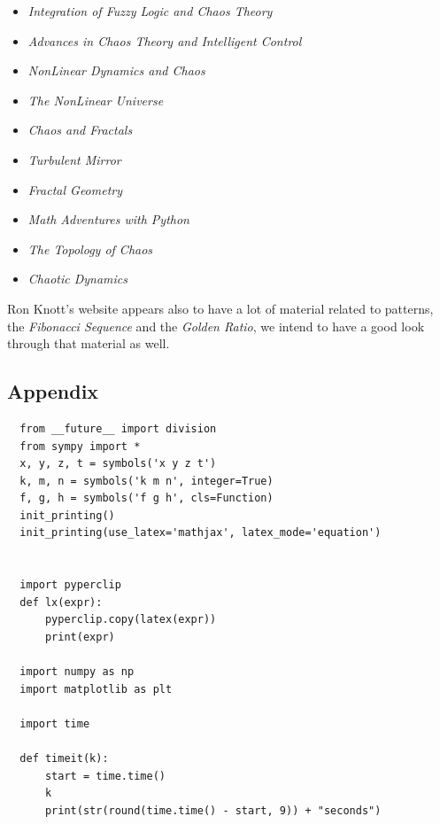 \documentclass[11pt]{article}
\begin{document}
\begin{itemize}
\item \emph{Integration of Fuzzy Logic and Chaos Theory}      \cite{liIntegrationFuzzyLogic2006}
\item \emph{Advances in Chaos Theory and Intelligent Control} \cite{azarAdvancesChaosTheory2016}
\item \emph{NonLinear Dynamics and Chaos}                     \cite{strogatzNonlinearDynamicsChaos2015}
\item \emph{The NonLinear Universe}                           \cite{scottNonlinearUniverseChaos2007}
\item \emph{Chaos and Fractals}                               \cite{peitgenChaosFractalsNew2004}
\item \emph{Turbulent Mirror}                                 \cite{briggsTurbulentMirrorIllustrated1989}
\item \emph{Fractal Geometry}                                 \cite{falconerFractalGeometryMathematical2003b}
\item \emph{Math Adventures with Python}                      \cite{farrellMathAdventuresPython2019}
\item \emph{The Topology of Chaos}                            \cite{gilmoreTopologyChaosAlice2002}
\item \emph{Chaotic Dynamics}                                 \cite{telChaoticDynamicsIntroduction2006}
\end{itemize}

Ron Knott's website appears also to have a lot of material related to patterns, the \emph{Fibonacci Sequence} and the \emph{Golden Ratio}, we intend to have a good look through that material as well. \cite{ronknottFibonacciNumbersGolden2016}

\subsection{Appendix}
\label{sec:org3529cb7}

\begin{lstlisting}
  from __future__ import division
  from sympy import *
  x, y, z, t = symbols('x y z t')
  k, m, n = symbols('k m n', integer=True)
  f, g, h = symbols('f g h', cls=Function)
  init_printing()
  init_printing(use_latex='mathjax', latex_mode='equation')


  import pyperclip
  def lx(expr):
      pyperclip.copy(latex(expr))
      print(expr)

  import numpy as np
  import matplotlib as plt

  import time

  def timeit(k):
      start = time.time()
      k
      print(str(round(time.time() - start, 9)) + "seconds")
\end{lstlisting}
\end{document}
